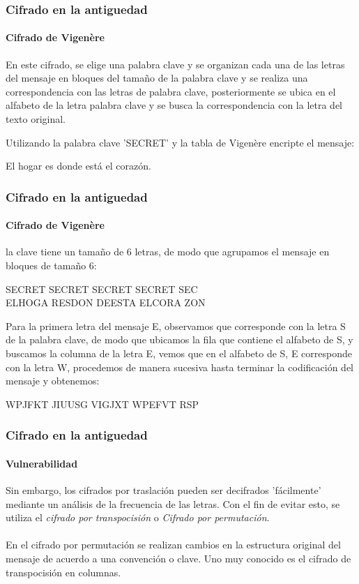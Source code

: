 \documentclass[spanish, mexico]{beamer}
\begin{document}
	\begin{frame}
		\frametitle{Cifrado en la antiguedad}
		\framesubtitle{Cifrado de Vigenère}
		En este cifrado, se elige una palabra clave y se organizan cada una de las letras del mensaje en bloques del tamaño de la palabra clave y se realiza una correspondencia con las letras de palabra clave, posteriormente se ubica en el alfabeto de la letra palabra clave y se busca la correspondencia con la letra del texto original.
		\begin{example}
			Utilizando la palabra clave 'SECRET' y la tabla de Vigenère encripte el mensaje:
			\begin{center}
				El hogar es donde está el corazón.
			\end{center}
		\end{example}
	\end{frame}
	\begin{frame}
		\frametitle{Cifrado en la antiguedad}
		\framesubtitle{Cifrado de Vigenère}
		\begin{solution}
			la clave tiene un tamaño de 6 letras, de modo que agrupamos el mensaje en bloques de tamaño 6:
			\begin{center}
				SECRET SECRET SECRET SECRET SEC\\
				ELHOGA RESDON DEESTA ELCORA ZON
			\end{center}
			Para la primera letra del mensaje E, observamos que corresponde con la letra S de la palabra clave, de modo que ubicamos la fila que contiene el alfabeto de S, y buscamos la columna de la letra E, vemos que en el alfabeto de S, E corresponde con la letra W, procedemos de manera sucesiva hasta terminar la codificación del mensaje y obtenemos:
			\begin{center}
				WPJFKT JIUUSG VIGJXT WPEFVT RSP
			\end{center}
		\end{solution}

			
	\end{frame}

	\begin{frame}
		\frametitle{Cifrado en la antiguedad}
		\framesubtitle{Vulnerabilidad}
		Sin embargo, los cifrados por traslación pueden ser decifrados 'fácilmente' mediante un análisis de la frecuencia de las letras. Con el fin de evitar esto, se utiliza el \textit{cifrado por transpocisión} o \textit{Cifrado por permutación}.\\~\\
		En el cifrado por permutación se realizan cambios en la estructura original del mensaje de acuerdo a una convención o clave. Uno muy conocido es el cifrado de transpocisión en columnas.
	\end{frame}
\end{document}
